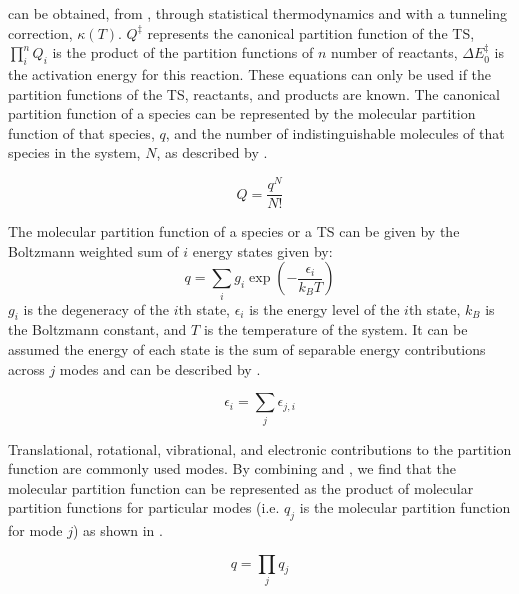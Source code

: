 \documentclass[preprint, 11pt]{elsarticle} %
\begin{document}
 can be obtained, from , through statistical thermodynamics and with a tunneling correction, $\kappa(T)$. 
$Q^\ddagger$ represents the canonical partition function of the TS, $\prod^n_i Q_i$ is the product of the partition functions of $n$ number of reactants, $\Delta E^{\ddagger}_0$ is the activation energy for this reaction.
These equations can only be used if the partition functions of the TS, reactants, and products are known. 
The canonical partition function of a species can be represented by the molecular partition function of that species, $q$, and the number of indistinguishable molecules of that species in the system, $N$, as described by .

\begin{equation}
    Q = \frac{q^N}{N!}
    \label{eq:q}
\end{equation}


The molecular partition function of a species or a TS can be given by the Boltzmann weighted sum of $i$ energy states given by:
\begin{equation}
    q = \sum_i g_i \exp\left(-\frac{\epsilon_i}{k_B T}\right)
    \label{eq:Q}
\end{equation}
$g_i$ is the degeneracy of the $i$th state, $\epsilon_i$ is the energy level of the $i$th state, $k_B$ is the Boltzmann constant, and $T$ is the temperature of the system.
It can be assumed the energy of each state is the sum of  separable energy contributions across $j$ modes and can be described by .

\begin{equation}
    \epsilon_i = \sum_j \epsilon_{j,i}
    \label{eq:epsilon}
\end{equation}

Translational, rotational, vibrational, and electronic contributions to the partition function are commonly used modes.
By combining  and , we find that the molecular partition function can be represented as the product of molecular partition functions for particular modes (i.e. $q_j$ is the molecular partition function for mode $j$) as shown in . 
 
\begin{equation}
    q = \prod_j q_j
    \label{qtot}
\end{equation}
\end{document}
